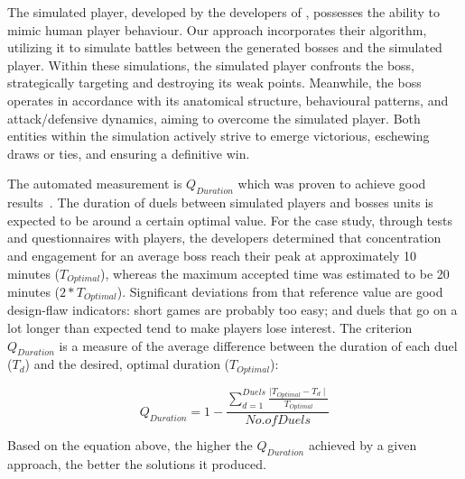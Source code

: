The simulated player, developed by the developers of  \CaseStudy{}, possesses the ability to mimic human player behaviour. Our approach incorporates their algorithm, utilizing it to simulate battles between the generated bosses and the simulated player. Within these simulations, the simulated player confronts the boss, strategically targeting and destroying its weak points. Meanwhile, the boss operates in accordance with its anatomical structure, behavioural patterns, and attack/defensive dynamics, aiming to overcome the simulated player. Both entities within the simulation actively strive to emerge victorious, eschewing draws or ties, and ensuring a definitive win. 

The automated measurement is $Q_{Duration}$ which was proven to achieve good results~\cite{browne2010evolutionary}. The duration of duels between simulated players and bosses units is expected to be around a certain optimal value. For the \CaseStudy{} case study, through tests and questionnaires with players, the developers determined that concentration and engagement for an average boss reach their peak at approximately 10 minutes ($T_{Optimal}$), whereas the maximum accepted time was estimated to be 20 minutes ($2*T_{Optimal}$). Significant deviations from that reference value are good design-flaw indicators: short games are probably too easy; and duels that go on a lot longer than expected tend to make players lose interest. The criterion $Q_{Duration}$ is a measure of the average difference between the duration of each duel ($T_{d}$) and the desired, optimal duration ($T_{Optimal}$):

\begin{equation}
	Q_{Duration} =  1 - \frac{\sum\limits_{d=1}^{Duels}\frac{\mid T_{Optimal} - T_{d} \mid}{T_{Optimal}}}{No. of Duels} 
\end{equation}

Based on the equation above, the higher the $Q_{Duration}$ achieved by a given approach, the better the solutions it produced.

